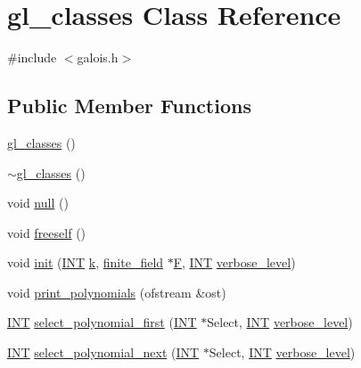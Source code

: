 \hypertarget{classgl__classes}{}\section{gl\+\_\+classes Class Reference}
\label{classgl__classes}


{\ttfamily \#include $<$galois.\+h$>$}

\subsection*{Public Member Functions}
\begin{DoxyCompactItemize}
\item 
\mbox{\hyperlink{classgl__classes_ac6ab5dbcb31ce0511563d9791b3db172}{gl\+\_\+classes}} ()
\item 
\mbox{\hyperlink{classgl__classes_a1650b4f7e735662108e163ba7ca13e9f}{$\sim$gl\+\_\+classes}} ()
\item 
void \mbox{\hyperlink{classgl__classes_aaaf0d9229c8d3ef44b35bb592dfae392}{null}} ()
\item 
void \mbox{\hyperlink{classgl__classes_a1bc99a6dac89f1d6f4a739efe75729dd}{freeself}} ()
\item 
void \mbox{\hyperlink{classgl__classes_a48ec2319989d4fc7b36d736aef4f6452}{init}} (\mbox{\hyperlink{galois_8h_a09fddde158a3a20bd2dcadb609de11dc}{I\+NT}} \mbox{\hyperlink{classgl__classes_af4e96aca00c946d04d95df712203c866}{k}}, \mbox{\hyperlink{classfinite__field}{finite\+\_\+field}} $\ast$\mbox{\hyperlink{classgl__classes_a488ed3305aee4f953b86c06a26031df6}{F}}, \mbox{\hyperlink{galois_8h_a09fddde158a3a20bd2dcadb609de11dc}{I\+NT}} \mbox{\hyperlink{simeon_8_c_a818073fbcc2f439e7c56952f67386122}{verbose\+\_\+level}})
\item 
void \mbox{\hyperlink{classgl__classes_a7196364aa945ad33ddf36f1b031bba16}{print\+\_\+polynomials}} (ofstream \&ost)
\item 
\mbox{\hyperlink{galois_8h_a09fddde158a3a20bd2dcadb609de11dc}{I\+NT}} \mbox{\hyperlink{classgl__classes_a9d3a3fcb30560a45bad78b67f075a760}{select\+\_\+polynomial\+\_\+first}} (\mbox{\hyperlink{galois_8h_a09fddde158a3a20bd2dcadb609de11dc}{I\+NT}} $\ast$Select, \mbox{\hyperlink{galois_8h_a09fddde158a3a20bd2dcadb609de11dc}{I\+NT}} \mbox{\hyperlink{simeon_8_c_a818073fbcc2f439e7c56952f67386122}{verbose\+\_\+level}})
\item 
\mbox{\hyperlink{galois_8h_a09fddde158a3a20bd2dcadb609de11dc}{I\+NT}} \mbox{\hyperlink{classgl__classes_af02618085f548665644d9e679abb0d1f}{select\+\_\+polynomial\+\_\+next}} (\mbox{\hyperlink{galois_8h_a09fddde158a3a20bd2dcadb609de11dc}{I\+NT}} $\ast$Select, \mbox{\hyperlink{galois_8h_a09fddde158a3a20bd2dcadb609de11dc}{I\+NT}} \mbox{\hyperlink{simeon_8_c_a818073fbcc2f439e7c56952f67386122}{verbose\+\_\+level}})

\end{DoxyCompactItemize}
